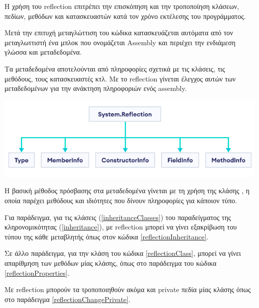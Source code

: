 \titleformat{\chapter}{}{}{0em}{\bf\LARGE}

Η χρήση του reflection επιτρέπει την επισκόπηση και την τροποποίηση κλάσεων, πεδίων, μεθόδων και κατασκευαστών κατά τον χρόνο εκτέλεσης του προγράμματος.

Μετά την επιτυχή μεταγλώττιση του κώδικα κατασκευάζεται αυτόματα από τον μεταγλωττιστή ένα μπλοκ που ονομάζεται Assembly και περιέχει την ενδιάμεση γλώσσα και μεταδεδομένα.

Τα μεταδεδομένα αποτελούνται από πληροφορίες σχετικά με τις κλάσεις, τις μεθόδους, τους κατασκευαστές κτλ. Με το reflection γίνεται έλεγχος αυτών των μεταδεδομένων για την ανάκτηση πληροφοριών ενός assembly.

\includegraphics[width=\fullwidthimage]{code/Reflection/csharp-reflection-hierarchy.png}

Η βασική μέθοδος πρόσβασης στα μεταδεδομένα γίνεται με τη χρήση της κλάσης , η οποία παρέχει μεθόδους και ιδιότητες που δίνουν πληροφορίες για κάποιον τύπο.

Για παράδειγμα, για τις κλάσεις (\ref{inheritanceClasses}) του παραδείγματος της κληρονομικότητας (\ref{inheritance}), με reflection μπορεί να γίνει εξακρίβωση του τύπου της κάθε μεταβλητής όπως στον κώδικα \ref{reflectionInheritance}.





Σε άλλο παράδειγμα, για την κλάση του κώδικα \ref{reflectionClass}, μπορεί να γίνει απαρίθμηση των μεθόδων μίας κλάσης, όπως στο παράδειγμα του κώδικα \ref{reflectionProperties}.



Με reflection μπορούν τα τροποποιηθούν ακόμα και private πεδία μίας κλάσης όπως στο παράδειγμα \ref{reflectionChangePrivate}.



